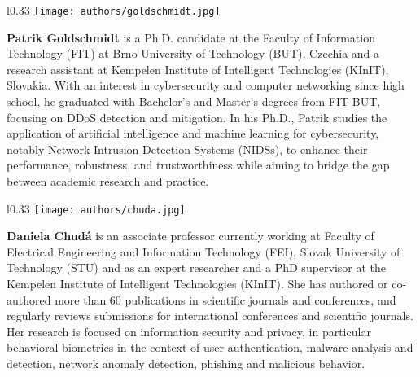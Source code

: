 
\begin{wrapfigure}{l}{0.33\linewidth}
    \vspace{-12pt}
    \texttt{[image: authors/goldschmidt.jpg]}
    \vspace{-15pt}
\end{wrapfigure}
\noindent
\textbf{Patrik Goldschmidt} is a Ph.D. candidate at the Faculty of Information Technology (FIT) at Brno University of Technology (BUT), Czechia and a research assistant at Kempelen Institute of Intelligent Technologies (KInIT), Slovakia. With an interest in cybersecurity and computer networking since high school, he graduated with Bachelor's and Master's degrees from FIT BUT, focusing on DDoS detection and mitigation. In his Ph.D., Patrik studies the application of artificial intelligence and machine learning for cybersecurity, notably Network Intrusion Detection Systems (NIDSs), to enhance their performance, robustness, and trustworthiness while aiming to bridge the gap between academic research and practice.

\vspace{1em}

\begin{wrapfigure}{l}{0.33\linewidth}
    \texttt{[image: authors/chuda.jpg]}
    \vspace{-15pt}
\end{wrapfigure}
\noindent
\textbf{Daniela Chud\'a} is an associate professor currently working at Faculty of Electrical Engineering and Information Technology (FEI), Slovak University of Technology (STU) and as an expert researcher and a PhD supervisor at the Kempelen Institute of Intelligent Technologies (KInIT). She has authored or co-authored more than 60 publications in scientific journals and conferences, and regularly reviews submissions for international conferences and scientific journals. Her research is focused on  information security and privacy, in particular behavioral biometrics in the context of user authentication, malware analysis and detection, network anomaly detection, phishing and malicious behavior.